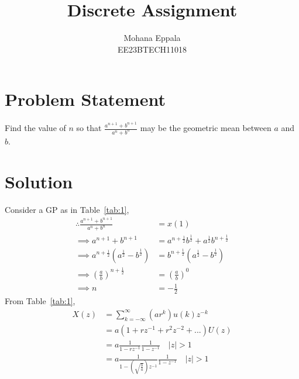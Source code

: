 \documentclass[12pt]{article}
\newcommand{\tabref}[1]{Table~\ref{#1}}
\providecommand{\abs}[1]{\left\vert#1\right\vert}
\begin{document}
\title{Discrete Assignment}
\author{Mohana Eppala\\ EE23BTECH11018}
\maketitle

\section*{Problem Statement}
Find the value of $n$ so that $\frac{a^{n+1} + b^{n+1}}{a^{n}+b^{n}}$ may be the geometric mean between $a$ and $b$.
\section{Solution}

\begin{table}[H]

\end{table}

Consider a GP as in \tabref{tab:1},
\begin{align}
	\therefore \frac{a^{n+1} + b^{n+1}}{a^{n}+b^{n}} &= x(1) \\
	\implies a^{n+1} + b^{n+1} &= a^{n+\frac{1}{2}}b^{\frac{1}{2}} + a^{\frac{1}{2}}b^{n+\frac{1}{2}} \\
\implies a^{n+\frac{1}{2}}(a^{\frac{1}{2}} - b^{\frac{1}{2}}) &= b^{n+\frac{1}{2}}(a^{\frac{1}{2}} - b^{\frac{1}{2}}) \\
\implies (\frac{a}{b})^{n+\frac{1}{2}} &= (\frac{a}{b})^{0} \\
\implies n &= -\frac{1}{2}
\end{align}
From \tabref{tab:1},
\begin{align}
	X(z) &= \sum_{k=-\infty}^{\infty} (ar^{k})u(k)z^{-k} \\
	&= a(1+rz^{-1}+r^{2}z^{-2}+...)U(z) \\
	&= a{\frac{1}{1-rz^{-1}}}{\frac{1}{1-z^{-1}}} \quad \abs{z}>1 \\
	&= a{\frac{1}{1-(\sqrt{\frac{b}{a}})z^{-1}}}{\frac{1}{1-z^{-1}}} \quad \abs{z}>1
\end{align}
\end{document}
